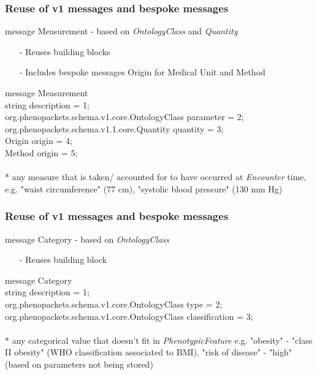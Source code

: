\documentclass{beamer}
\begin{document}
\begin{frame}
\frametitle{Reuse of v1 messages and bespoke messages}
\begin{block}{message Measurement - based on \textit{OntologyClass} and \textit{Quantity}}
\begin{itemize} 
\item[-] Reuses building blocks
\item[-] Includes bespoke messages Origin for Medical Unit and Method 
\end{itemize}
\end{block}
message \colorbox{yellow!80}{Measurement} \ {\\
    string description = 1; \\
    org.phenopackets.schema.v1.core.OntologyClass parameter = 2; \\
    org.phenopackets.schema.v1.1.core.Quantity quantity = 3; \\
    \colorbox{yellow!80}{Origin} origin = 4; \\
     \colorbox{yellow!80}{Method} origin = 5; \\
\ } \\

{\color{blue}* any measure that is taken/ accounted for to have occurred at \textit{Encounter} time, e.g. "waist circumference" (77 cm), "systolic blood pressure" (130 mm Hg)} 

\end{frame}


\begin{frame}
\frametitle{Reuse of v1 messages and bespoke messages}
\begin{block}{message Category - based on \textit{OntologyClass}}
\begin{itemize} 
\item[-] Reuses building block 
\end{itemize}
\end{block}
message \colorbox{yellow!80}{Category} \ { \\
    string description = 1; \\
    org.phenopackets.schema.v1.core.OntologyClass type = 2; \\
    org.phenopackets.schema.v1.core.OntologyClass classification = 3; \\
\ } \\

{\color{blue}* any categorical value that doesn't fit in \textit{PhenotypicFeature} e.g. "obesity" - "class II obesity" (WHO classification associated to BMI), "risk of disease" - "high" (based on parameters not being stored)}

\end{frame}
\end{document}
